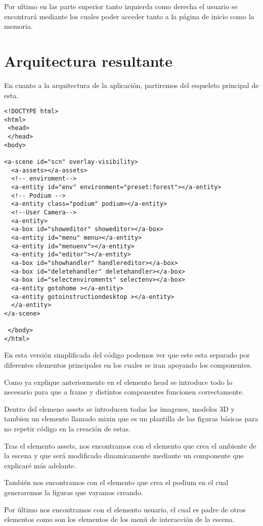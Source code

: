 \documentclass[a4paper, 12pt]{book}
\begin{document}
Por ultimo en las parte superior tanto izquierda como derecha el usuario se encontrará mediante los cuales poder acceder tanto a la página de inicio como la memoria.

\section{Arquitectura resultante} 
\label{sec:Arquitectura resultante}
En cuanto a la arquitectura de la aplicación, partiremos del esqueleto principal de esta.
\begin{verbatim}
<!DOCTYPE html>
<html>
 <head>
 </head>
<body>

<a-scene id="scn" overlay-visibility>
  <a-assets></a-assets>
  <!-- enviroment-->
  <a-entity id="env" environment="preset:forest"></a-entity>
  <!-- Podium -->
  <a-entity class="podium" podium></a-entity> 
  <!--User Camera-->
  <a-entity>
  <a-box id="showeditor" showeditor></a-box>
  <a-entity id="menu" menu></a-entity>
  <a-entity id="menuenv"></a-entity>
  <a-entity id="editor"></a-entity>
  <a-box id="showhandler" handlereditor></a-box>
  <a-box id="deletehandler" deletehandler></a-box>
  <a-box id="selectenviroments" selectenv></a-box>
  <a-entity gotohome ></a-entity>
  <a-entity gotoinstructiondesktop ></a-entity>
  </a-entity>
</a-scene>
  
 </body>
</html> 
\end{verbatim}

En esta versión simplificada del código podemos ver que este esta separado por diferentes elementos principales en los cuales se iran apoyando los componentes.

Como ya explique anteriormente en el elemento head se introduce todo lo necesario para que a frame y distintos componentes funcionen correctamente.

Dentro del elemeno assets se introducen todas las imagenes, modelos 3D y tambien un elemento llamado mixin que es un plantilla de las figuras básicas para no repetir código en la creación de estas.

Tras el elemento assets, nos encontramos con el elemento que crea el ambiente de la escena y que será modificado dinamicamente mediante un componente que explicaré más adelante.

También nos encontramos con el elemento que crea el podium en el cual generaremos la figuras que vayamos creando.

Por último nos encontramos con el elemento usuario, el cual es padre de otros elementos como son los elementos de los menú de interacción de la escena.
\end{document}

